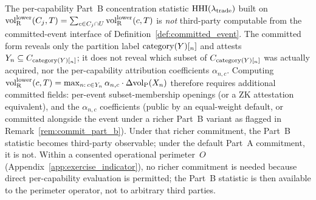 \begin{remark}
\label{rem:wireheading_part_b_obs}
The per-capability Part~B concentration statistic
$\mathrm{HHI}(\lambda_{\mathrm{trade}})$ built on
${\operatorname{vol}_{\mathrm{R}}^{\mathrm{lower}}}(C_j, T) = \sum_{c \in C_j \cap U} {\operatorname{vol}_{\mathrm{R}}^{\mathrm{lower}}}(c, T)$
is \emph{not} third-party computable from the committed-event
interface of Definition~\ref{def:committed_event}.  The
committed form reveals only the partition label $\mathrm{category}(Y)[_n]$ and
attests $Y_n \subseteq C_{\mathrm{category}(Y)[_n]}$; it does not reveal which
subset of $C_{\mathrm{category}(Y)[_n]}$ was actually acquired, nor the
per-capability attribution coefficients $\alpha_{n,c}$.
Computing ${\operatorname{vol}_{\mathrm{R}}^{\mathrm{lower}}}(c, T) =
\max_{n :\, c \in Y_n} \alpha_{n,c} \cdot \Delta{\operatorname{vol}_{\mathrm{P}}}(X_n)$
therefore requires additional committed fields: per-event
subset-membership openings (or a ZK attestation equivalent), and
the $\alpha_{n,c}$ coefficients (public by an equal-weight
default, or committed alongside the event under a richer
Part~B variant as flagged in Remark~\ref{rem:commit_part_b}).
Under that richer commitment, the Part~B statistic becomes
third-party observable; under the default Part~A commitment, it
is not.  Within a consented operational perimeter~$O$
(Appendix~\ref{app:exercise_indicator}), no richer commitment is
needed because direct per-capability evaluation is permitted;
the Part~B statistic is then available to the perimeter
operator, not to arbitrary third parties.
\end{remark}
